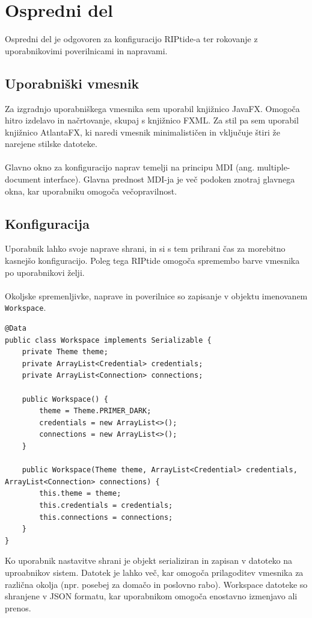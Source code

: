 \documentclass[12pt]{article}
\begin{document}
\section{Ospredni del}
Ospredni del je odgovoren za konfiguracijo RIPtide-a ter rokovanje z 
uporabnikovimi poverilnicami in napravami.

\subsection{Uporabniški vmesnik}
Za izgradnjo uporabniškega vmesnika sem uporabil knjižnico JavaFX. Omogoča
hitro izdelavo in načrtovanje, skupaj s knjižnico FXML. Za stil pa sem
uporabil knjižnico AtlantaFX, ki naredi vmesnik minimalističen in vključuje
štiri že narejene stilske datoteke.
\\\\
Glavno okno za konfiguracijo naprav temelji na principu MDI (ang.
multiple-document interface). Glavna prednost MDI-ja je več podoken znotraj
glavnega okna, kar uporabniku omogoča večopravilnost.

\subsection{Konfiguracija}
Uporabnik lahko svoje naprave shrani, in si s tem prihrani čas za
morebitno kasnejšo konfiguracijo. Poleg tega RIPtide omogoča spremembo
barve vmesnika po uporabnikovi želji.
\\\\
Okoljske spremenljivke, naprave in poverilnice so zapisanje v objektu
imenovanem \texttt{Workspace}.

\begin{lstlisting}[style=JavaStyle]
@Data
public class Workspace implements Serializable {
	private Theme theme;
	private ArrayList<Credential> credentials;
	private ArrayList<Connection> connections;

	public Workspace() {
		theme = Theme.PRIMER_DARK;
		credentials = new ArrayList<>();
		connections = new ArrayList<>();
	}

	public Workspace(Theme theme, ArrayList<Credential> credentials, ArrayList<Connection> connections) {
		this.theme = theme;
		this.credentials = credentials;
		this.connections = connections;
	}
}
\end{lstlisting}
Ko uporabnik nastavitve shrani je objekt serializiran in zapisan v datoteko
na uproabnikov sistem. Datotek je lahko več, kar omogoča prilagoditev
vmesnika za različna okolja (npr. posebej za domačo in poslovno rabo).
Workspace datoteke so shranjene v JSON formatu, kar uporabnikom omogoča
enostavno izmenjavo ali prenos.
\end{document}
